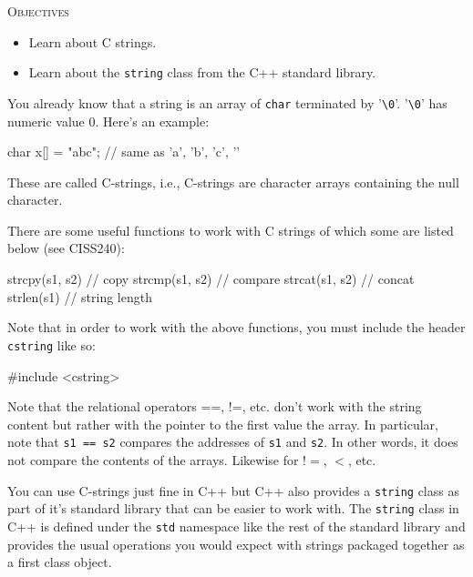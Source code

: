\newpage{}

\textsc{Objectives}

\begin{itemize}
\item
  Learn about C strings.
\item
  Learn about the \texttt{string} class from the C++ standard library.
\end{itemize}

\newpage{}

You already know that a string is an array of \texttt{char} terminated by '\verb!\0!'. '\verb!\0!' has numeric value 0. Here's an example:

\begin{console}
char x[] = "abc"; // same as {'a', 'b', 'c', '\0'}
\end{console}

These are called C-strings, i.e., C-strings are character arrays
containing the null character.

There are some useful functions to work with C strings of which some are
listed below (see CISS240):

\begin{console}
strcpy(s1, s2) // copy
strcmp(s1, s2) // compare
strcat(s1, s2) // concat
strlen(s1) // string length
\end{console}

Note that in order to work with the above functions, you must include
the header \texttt{cstring} like so:

\begin{console}
#include <cstring>
\end{console}

Note that the relational operators ==, !=, etc. don't work with the string content but rather with the pointer to the first value the array. In particular, note that \texttt{s1 == s2} compares the addresses of \texttt{s1} and \texttt{s2}. In other words, it does not compare the contents of the arrays. Likewise for $!=$, $<$, etc.

\newpage{}

You can use C-strings just fine in C++ but C++ also provides a
\texttt{string} class as part of it's standard library
that can be easier to work with. The \texttt{string} class in C++ is
defined under the \texttt{std} namespace like the rest of the standard
library and provides the usual operations you would expect with strings
packaged together as a first class object.

